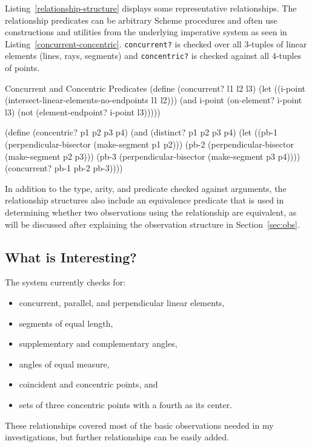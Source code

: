 Listing~\ref{relationship-structure} displays some representative
relationships.  The relationship predicates can be arbitrary Scheme
procedures and often use constructions and utilities from the
underlying imperative system as seen in
Listing~\ref{concurrent-concentric}.  \texttt{concurrent?} is checked
over all 3-tuples of linear elements (lines, rays, segments) and
\texttt{concentric?} is checked against all 4-tuples of points.

\begin{code-listing}
[label=concurrent-concentric]
{Concurrent and Concentric Predicates}
(define (concurrent? l1 l2 l3)
  (let ((i-point (intersect-linear-elements-no-endpoints l1 l2)))
    (and i-point
         (on-element? i-point l3)
         (not (element-endpoint? i-point l3)))))

(define (concentric? p1 p2 p3 p4)
  (and (distinct? p1 p2 p3 p4)
       (let ((pb-1 (perpendicular-bisector (make-segment p1 p2)))
             (pb-2 (perpendicular-bisector (make-segment p2 p3)))
             (pb-3 (perpendicular-bisector (make-segment p3 p4))))
         (concurrent? pb-1 pb-2 pb-3))))
\end{code-listing}

In addition to the type, arity, and predicate checked against
arguments, the relationship structures also include an equivalence
predicate that is used in determining whether two observations using
the relationship are equivalent, as will be discussed after
explaining the observation structure in Section~\ref{sec:obs}.

\subsection{What is Interesting?}
The system currently checks for:
\begin{spacing}{0.7}
\begin{itemize}
\item concurrent, parallel, and perpendicular linear elements,
\item segments of equal length,
\item supplementary and complementary angles,
\item angles of equal measure,
\item coincident and concentric points, and
\item sets of three concentric points with a fourth as its center.
\end{itemize}
\end{spacing}
\noindent These relationships covered most of the basic observations needed in
my investigations, but further relationships can be easily added.

